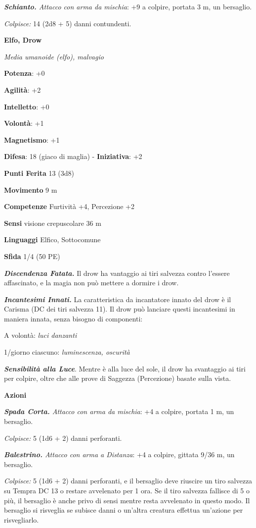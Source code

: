 \begin{multicols}{2}
\emph{\textbf{Schianto.} Attacco con arma da mischia}: +9 a colpire,
portata 3 m, un bersaglio.

\emph{Colpisce:} 14 (2d8 + 5) danni contundenti.

\textbf{Elfo, Drow}

\emph{Media umanoide (elfo), malvagio}

\textbf{Potenza}: +0

\textbf{Agilità}: +2

\textbf{Intelletto}: +0

\textbf{Volontà}: +1

\textbf{Magnetismo}: +1

\textbf{Difesa}: 18 (giaco di maglia) - \textbf{Iniziativa}: +2

\textbf{Punti Ferita} 13 (3d8)

\textbf{Movimento} 9 m

\textbf{Competenze} Furtività +4, Percezione +2

\textbf{Sensi} visione crepuscolare 36 m

\textbf{Linguaggi} Elfico, Sottocomune

\textbf{Sfida} 1/4 (50 PE)\smallskip

\emph{\textbf{Discendenza Fatata.}} Il drow ha vantaggio ai tiri
salvezza contro l'essere affascinato, e la magia non può mettere a
dormire i drow.

\emph{\textbf{Incantesimi Innati.}} La caratteristica da incantatore
innato del drow è il Carisma (DC dei tiri salvezza 11). Il drow può
lanciare questi incantesimi in maniera innata, senza bisogno di
componenti:

A volontà: \emph{luci danzanti}

1/giorno ciascuno: \emph{luminescenza, oscurità}

\emph{\textbf{Sensibilità alla Luce}}. Mentre è alla luce del sole, il
drow ha svantaggio ai tiri per colpire, oltre che alle prove di Saggezza
(Percezione) basate sulla vista.

\smallskip\textbf{Azioni}

\emph{\textbf{Spada Corta.} Attacco con arma da mischia}: +4 a colpire,
portata 1 m, un bersaglio.

\emph{Colpisce:} 5 (1d6 + 2) danni perforanti.

\emph{\textbf{Balestrino.} Attacco con arma a Distanza}: +4 a colpire,
gittata 9/36 m, un bersaglio.

\emph{Colpisce:} 5 (1d6 + 2) danni perforanti, e il bersaglio deve
riuscire un tiro salvezza su Tempra DC 13 o restare avvelenato per
1 ora. Se il tiro salvezza fallisce di 5 o più, il bersaglio è anche
privo di sensi mentre resta avvelenato in questo modo. Il bersaglio si
risveglia se subisce danni o un'altra creatura effettua un'azione per
risvegliarlo.




\end{multicols}
